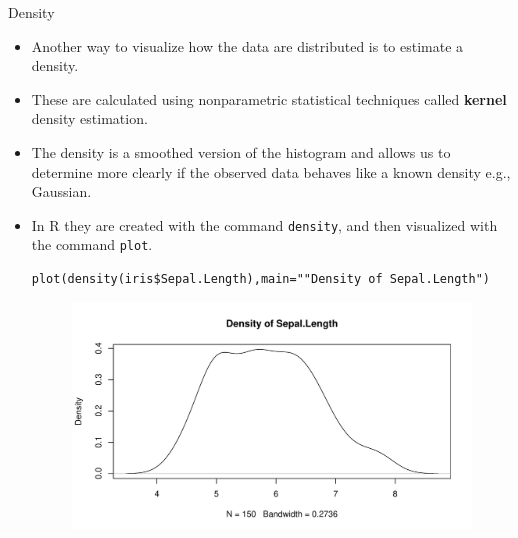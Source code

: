 \documentclass[handout]{beamer}
\begin{document}
\begin{frame}[fragile]{Density}
\scriptsize{
\begin{itemize}
 \item Another way to visualize how the data are distributed is to estimate a density.
 \item These are calculated using nonparametric statistical techniques called \textbf{kernel} density estimation.
 \item The density is a smoothed version of the histogram and allows us to determine more clearly if the observed data behaves like a known density e.g., Gaussian.  
 \item In R they are created with the command \verb+density+, and then visualized with the command \verb+plot+.

 \begin{verbatim}
plot(density(iris$Sepal.Length),main=""Density of Sepal.Length")
 \end{verbatim}
 \begin{figure}[h!]
	\centering
	\includegraphics[scale=0.38]{pics/density.pdf}
	
	
\end{figure} 

\end{itemize}




}
\end{frame}
\end{document}
